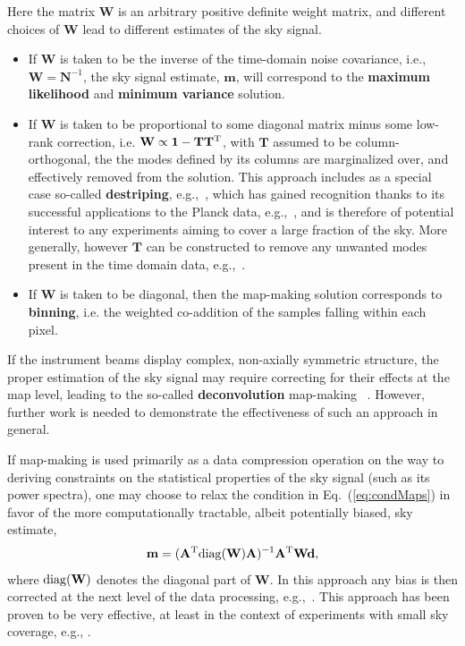 Here the matrix $\mathbf{W}$ is an arbitrary positive definite weight matrix, and different choices of $\mathbf{W}$ lead to different estimates of the sky signal.
\begin{itemize}
\item If $\mathbf{W}$ is taken to be the inverse of the time-domain noise covariance, i.e., $\mathbf{W} = \mathbf{N}^{-1}$,
the sky signal estimate, $\mathbf{m}$, will correspond to the {\bf maximum likelihood} and {\bf minimum variance}
solution. 
\item If $\mathbf{W}$ is taken to be proportional to some diagonal matrix minus some low-rank correction, i.e. $\mathbf{W} \propto \mathbf{1} - \mathbf{T}\mathbf{T}^{\rm T}$,  with $\mathbf{T}$ assumed to be column-orthogonal, the the modes defined by its columns are marginalized over, and effectively removed from the solution. This approach includes as a special case so-called {\bf destriping}, e.g.,~\cite{Poutanen2004, Keihanen2004}, which has gained recognition thanks to its successful applications to the Planck data, e.g.,~\cite{Keihanen2010, Tristram2011, LFIMaps2015, HFImaps2015}, and is therefore of potential interest to any experiments aiming to cover a large fraction of the sky. More generally, however $\mathbf{T}$ can be constructed to remove any unwanted modes present in the time domain data, e.g.,~\cite{Stompor2001, Cantalupo2010, Dunner2013}.
\item If $\mathbf{W}$ is taken to be diagonal, then the map-making solution corresponds to {\bf binning}, i.e. the weighted co-addition of the samples falling within each pixel.
\end{itemize}
If the instrument beams display complex, non-axially symmetric structure, the proper estimation of the sky signal may require correcting for their effects at the map level, leading to the so-called {\bf deconvolution} map-making ~\cite{ArmitageWandelt2004, Harrison2011, KeihanenReinecke2012}.  However, further work is needed to demonstrate the effectiveness of such an approach in general.

If map-making is used primarily as a data compression operation on the way to deriving constraints on the statistical properties of the sky signal (such as its power spectra), one may choose to relax the condition in Eq.~(\ref{eq:condMaps}) in favor of the more computationally tractable, albeit potentially biased, sky estimate,
\begin{eqnarray}
\mathbf{m} = (\mathbf{A}^{\rm T} {\rm diag}( \mathbf{W}) \mathbf{A})^{-1} \mathbf{A}^{\rm T}\mathbf{W} \mathbf{d},
\end{eqnarray}
where ${\rm diag}( \mathbf{W})$ denotes the diagonal part of $\mathbf{W}$. In this approach any bias is then corrected at the next level of the data processing, e.g.,~\cite{Hivon2002}. This approach has been proven to be very effective, at least in the context of experiments with small sky coverage, e.g., \cite{QUAD2010, SPT2011, POLARBEAR, BICEP2014}.

